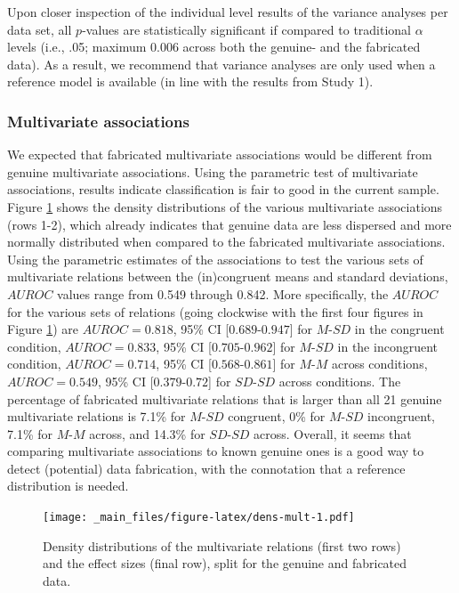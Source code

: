 \documentclass[a5paper]{book}
\begin{document}
Upon closer inspection of the individual level results of the variance
analyses per data set, all \(p\)-values are statistically significant if
compared to traditional \(\alpha\) levels (i.e., .05; maximum 0.006
across both the genuine- and the fabricated data). As a result, we
recommend that variance analyses are only used when a reference model is
available (in line with the results from Study 1).

\subsubsection{Multivariate
associations}\label{multivariate-associations-1}

We expected that fabricated multivariate associations would be different
from genuine multivariate associations. Using the parametric test of
multivariate associations, results indicate classification is fair to
good in the current sample. Figure \ref{fig:dens-mult} shows the density
distributions of the various multivariate associations (rows 1-2), which
already indicates that genuine data are less dispersed and more normally
distributed when compared to the fabricated multivariate associations.
Using the parametric estimates of the associations to test the various
sets of multivariate relations between the (in)congruent means and
standard deviations, \(AUROC\) values range from 0.549 through 0.842.
More specifically, the \(AUROC\) for the various sets of relations
(going clockwise with the first four figures in Figure
\ref{fig:dens-mult}) are \(AUROC=0.818\), 95\% CI
{[}\(0.689\)-\(0.947\){]} for \(M\)-\(SD\) in the congruent condition,
\(AUROC=0.833\), 95\% CI {[}\(0.705\)-\(0.962\){]} for \(M\)-\(SD\) in
the incongruent condition, \(AUROC=0.714\), 95\% CI
{[}\(0.568\)-\(0.861\){]} for \(M\)-\(M\) across conditions,
\(AUROC=0.549\), 95\% CI {[}\(0.379\)-\(0.72\){]} for \(SD\)-\(SD\)
across conditions. The percentage of fabricated multivariate relations
that is larger than all 21 genuine multivariate relations is 7.1\% for
\(M\)-\(SD\) congruent, 0\% for \(M\)-\(SD\) incongruent, 7.1\% for
\(M\)-\(M\) across, and 14.3\% for \(SD\)-\(SD\) across. Overall, it
seems that comparing multivariate associations to known genuine ones is
a good way to detect (potential) data fabrication, with the connotation
that a reference distribution is needed.

\begin{figure}
\centering
\texttt{[image: \_main\_files/figure-latex/dens-mult-1.pdf]}
\caption{\label{fig:dens-mult}Density distributions of the multivariate
relations (first two rows) and the effect sizes (final row), split for
the genuine and fabricated data.}
\end{figure}
\end{document}
